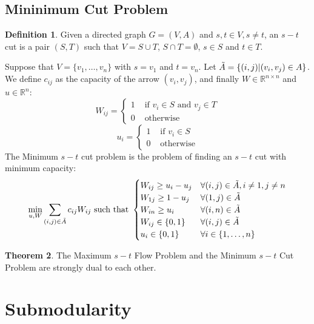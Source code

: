 \documentclass[12pt, openany]{report}
\newcommand{\R}{\mathbb{R}}
\theoremstyle{definition}
\newtheorem{thm}{Theorem}[chapter]
\newtheorem{definition}[thm]{Definition}
\begin{document}
\section{Mininimum Cut Problem}
\begin{definition}
    Given a directed graph $G=(V,A)$ and $s,t\in V,s\neq t$, an $s-t$ cut is a pair $(S,T)$ such that $V=S\cup T$, $S\cap T=\emptyset$, $s\in S$ and $t\in T$.
\end{definition}
Suppose that $V=\{v_1,\dots,v_n\}$ with $s=v_1$ and $t=v_n$. Let $\Tilde A=\{(i,j)|(v_i,v_j)\in A\}$. We define $c_{ij}$ as the capacity of the arrow $(v_i,v_j)$, and finally $W\in \R^{n\times n}$ and $u\in \R^n$:
\begin{equation}
    W_{ij} = \begin{cases}
        1& \text{ if } v_i \in S\text{ and } v_j\in T\\
        0& \text{ otherwise}    
    \end{cases}
\end{equation}
\begin{equation}
    u_i = \begin{cases}
        1& \text{ if } v_i \in S\\
        0& \text{ otherwise}    
    \end{cases}
\end{equation}
The Minimum $s-t$ cut problem is the problem of finding an $s-t$ cut with minimum capacity:
\begin{equation}
    \min_{u,W} \sum_{(i,j)\in \Tilde A}c_{ij}W_{ij}\text{ such that } \begin{cases}
        W_{ij}\ge u_i-u_j & \forall (i,j)\in \Tilde A, i\neq 1, j \neq n\\
        W_{1j}\ge 1-u_j & \forall (1,j)\in \Tilde A\\
        W_{in}\ge u_i & \forall (i,n)\in \Tilde A\\
        W_{ij}\in \{0,1\}& \forall (i,j)\in \Tilde A\\
        u_i \in \{0,1\} & \forall i\in \{1,\dots,n\}\\
    \end{cases}
\end{equation}
\begin{thm}
    The Maximum $s-t$ Flow Problem and the Minimum $s-t$ Cut Problem are strongly dual to each other.
\end{thm}
\chapter{Submodularity}
\end{document}
